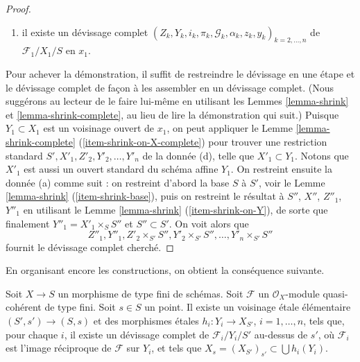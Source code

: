 \begin{proof}
\begin{enumerate}
\item[(d)] il existe un d\'evissage complet\newline
$(Z_k, Y_k, i_k, \pi_k, \mathcal{G}_k, \alpha_k, z_k, y_k)_{k = 2, \ldots, n}$
de $\mathcal{F}_1/X_1/S$ en $x_1$.
\end{enumerate}
Pour achever la démonstration, il suffit de restreindre le d\'evissage en une étape
et le d\'evissage complet de façon à les assembler en un
d\'evissage complet. (Nous suggérons au lecteur de le faire lui-même en utilisant
les Lemmes \ref{lemma-shrink} et
\ref{lemma-shrink-complete},
au lieu de lire la démonstration qui suit.) Puisque $Y_1 \subset X_1$
est un voisinage ouvert de $x_1$, on peut appliquer
le Lemme \ref{lemma-shrink-complete} (\ref{item-shrink-on-X-complete})
pour trouver une restriction standard $S', X'_1, Z'_2, Y'_2, \ldots, Y'_n$
de la donnée (d), telle que $X'_1 \subset Y_1$. Notons que $X'_1$ est aussi
un ouvert standard du schéma affine $Y_1$. On restreint ensuite la donnée
(a) comme suit : on restreint d'abord la base $S$ à $S'$, voir
le Lemme \ref{lemma-shrink} (\ref{item-shrink-base}), puis
on restreint le résultat à $S''$, $X''$, $Z''_1$, $Y''_1$ en utilisant
le Lemme \ref{lemma-shrink} (\ref{item-shrink-on-Y}),
de sorte que finalement $Y''_1 = X'_1 \times_S S''$ et $S'' \subset S'$.
On voit alors que
$$
Z''_1, Y''_1, Z'_2 \times_{S'} S'', Y'_2 \times_{S'} S'', \ldots,
Y'_n \times_{S'} S''
$$
fournit le d\'evissage complet cherché.
\end{proof}

\noindent
En organisant encore les constructions, on obtient la conséquence suivante.

\begin{lemma}
\label{lemma-existence-complete}
Soit $X \to S$ un morphisme de type fini de schémas.
Soit $\mathcal{F}$ un $\mathcal{O}_X$-module quasi-cohérent de type fini.
Soit $s \in S$ un point.
Il existe un voisinage \'etale élémentaire
$(S', s') \to (S, s)$ et des morphismes \'etales
$h_i : Y_i \to X_{S'}$, $i = 1, \ldots, n$, tels que, pour chaque
$i$, il existe un d\'evissage complet de $\mathcal{F}_i/Y_i/S'$ au-dessus de $s'$,
où $\mathcal{F}_i$ est l'image réciproque de $\mathcal{F}$ sur $Y_i$,
et tels que $X_s = (X_{S'})_{s'} \subset \bigcup h_i(Y_i)$.
\end{lemma}

